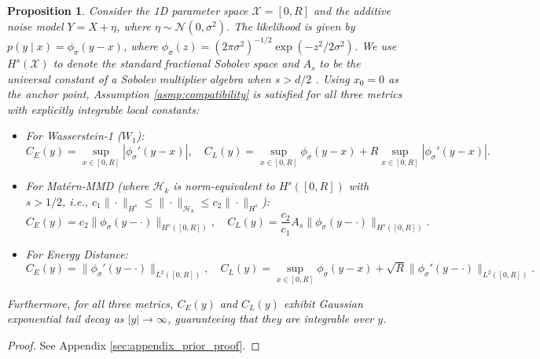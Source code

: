 \documentclass[twoside,11pt]{article}
\newtheorem{prop}{Proposition}[section]
\begin{document}
\begin{prop}
\label{prop:example}
    Consider the 1D parameter space $\mathcal{X} = [0, R]$ and the additive noise model $Y = X + \eta$, where $\eta \sim \mathcal{N}(0, \sigma^2)$. The likelihood is given by $p(y \mid x) = \phi_\sigma(y-x)$, where $\phi_\sigma(z) = (2\pi\sigma^2)^{-1/2} \exp(-z^2 / 2\sigma^2)$. We use $H^s(\mathcal{X})$ to denote the standard fractional Sobolev space \citep{di2012hitchhiker} and $A_s$ to be the universal constant of a Sobolev multiplier algebra when $s>d/2$ \citep{strichartz1967multipliers}. Using $x_0 = 0$ as the anchor point, Assumption \ref{asmp:compatibility} is satisfied for all three metrics with explicitly integrable local constants:
    \begin{itemize}
        \item For Wasserstein-1 ($W_1$): \[C_E(y) = \sup_{x \in [0,R]} |\phi_\sigma'(y-x)|,\quad C_L(y) = \sup_{x \in [0,R]} \phi_\sigma(y-x) + R \sup_{x \in [0,R]} |\phi_\sigma'(y-x)|.\]
        \item For Mat\'ern-MMD (where $\mathcal{H}_k$ is norm-equivalent to $H^s([0,R])$ with $s > 1/2$, i.e., $c_1 \|\cdot\|_{H^s} \le \|\cdot\|_{\mathcal{H}_k} \le c_2 \|\cdot\|_{H^s}$):
        \[C_E(y) = c_2\|\phi_\sigma(y-\cdot)\|_{H^s([0,R])},\quad C_L(y) = \frac{c_2}{c_1}A_s \|\phi_\sigma(y-\cdot)\|_{H^s([0,R])}.\]
        \item For Energy Distance:
        \[C_E(y) = \|\phi_\sigma'(y-\cdot)\|_{L^2([0,R])},\quad C_L(y) = \sup_{x \in [0,R]} \phi_\sigma(y-x) + \sqrt{R} \|\phi_\sigma'(y-\cdot)\|_{L^2([0,R])}.\]
    \end{itemize}
    Furthermore, for all three metrics, $C_E(y)$ and $C_L(y)$ exhibit Gaussian exponential tail decay as $|y| \to \infty$, guaranteeing that they are integrable over $y$.
\end{prop}
\begin{proof}
    See Appendix \ref{sec:appendix_prior_proof}.
\end{proof}
\end{document}
